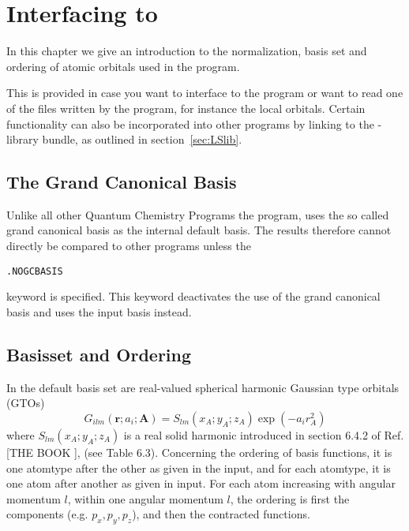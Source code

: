 \chapter{Interfacing to {\lsdalton}}\label{interfacing}

In this chapter we give an introduction to the normalization, basis set and ordering of atomic orbitals used in the {\lsdalton} program. 

This is provided in case you want to interface to the {\lsdalton} program or want to read one of the files written by the {\lsdalton} program, for instance 
the local orbitals.
Certain functionality can also be incorporated into other programs by linking to the
{\lsdalton}-library bundle, as outlined in section~\ref{sec:LSlib}.

\section{The Grand Canonical Basis}

Unlike all other Quantum Chemistry Programs the {\lsdalton} program, uses the so called grand canonical basis {\insertref} as the internal default basis. The results therefore cannot directly be compared to other programs unless the 
\begin{verbatim}
.NOGCBASIS
\end{verbatim}
keyword is specified. This keyword deactivates the use of the grand canonical basis and uses the input basis instead. 

\section{Basisset and Ordering}

In {\lsdalton} the default basis set are real-valued spherical harmonic Gaussian type
orbitals (GTOs)
\begin{equation}
G_{ilm}(\textbf{r}; a_{i};\textbf{A}) = S_{lm}(x_{A}; y_{A}; z_{A}) \exp(-a_{i}r^{2}_{A})
\end{equation}
where $S_{lm}(x_{A}; y_{A}; z_{A})$ is a real solid harmonic introduced in section 6.4.2 of Ref. [THE BOOK {\insertref}], (see Table 6.3).
Concerning the ordering of basis functions, it is one atomtype after the other as given
in the input, and for each atomtype, it is one atom after another as given in input. For
each atom increasing with angular momentum $l$, within one angular momentum $l$, the ordering 
is first the components (e.g. $p_{x},p_{y},p_{z}$), and then the contracted functions.



